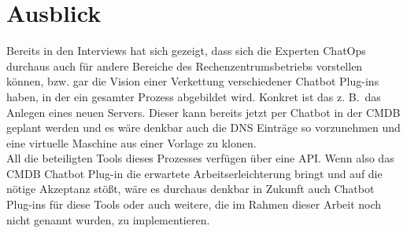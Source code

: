 \section{Ausblick}
Bereits in den Interviews hat sich gezeigt, dass sich die Experten ChatOps durchaus auch für andere Bereiche des Rechenzentrumsbetriebs vorstellen können, bzw. gar die Vision einer Verkettung verschiedener Chatbot Plug-ins haben, in der ein gesamter Prozess abgebildet wird. Konkret ist das z. B.~das Anlegen eines neuen Servers. Dieser kann bereits jetzt per Chatbot in der \acs{CMDB} geplant werden und es wäre denkbar auch die DNS Einträge so vorzunehmen und eine virtuelle Maschine aus einer Vorlage zu klonen.\\
All die beteiligten Tools dieses Prozesses verfügen über eine \acs{API}. Wenn also das \acs{CMDB} Chatbot Plug-in die erwartete Arbeitserleichterung bringt und auf die nötige Akzeptanz stößt, wäre es durchaus denkbar in Zukunft auch Chatbot Plug-ins für diese Tools oder auch weitere, die im Rahmen dieser Arbeit noch nicht genannt wurden, zu implementieren. 



